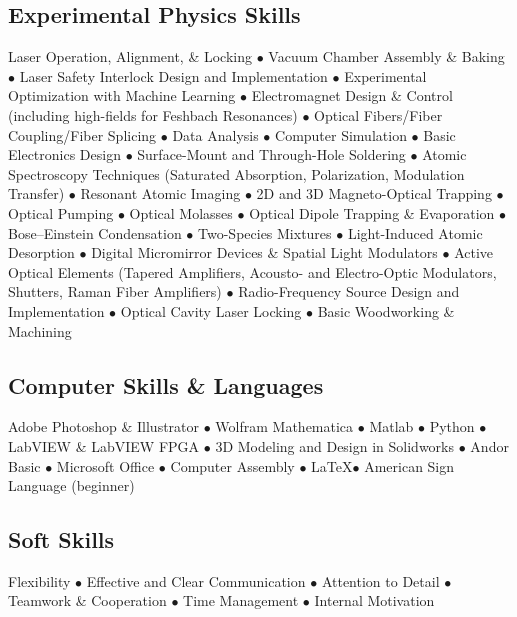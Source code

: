 \documentclass[12pt,letterpaper,sans]{moderncv}
\begin{document}
\subsection{Experimental Physics Skills}
Laser Operation, Alignment, \& Locking $\bullet$ Vacuum Chamber Assembly \& Baking $\bullet$ Laser Safety Interlock Design and Implementation $\bullet$ Experimental Optimization with Machine Learning $\bullet$ Electromagnet Design \& Control (including high-fields for Feshbach Resonances) $\bullet$ Optical Fibers/Fiber Coupling/Fiber Splicing $\bullet$ Data Analysis $\bullet$ Computer Simulation $\bullet$ Basic Electronics Design $\bullet$ Surface-Mount and Through-Hole Soldering $\bullet$ Atomic Spectroscopy Techniques (Saturated Absorption, Polarization, Modulation Transfer) $\bullet$ Resonant Atomic Imaging $\bullet$ 2D and 3D Magneto-Optical Trapping $\bullet$ Optical Pumping $\bullet$ Optical Molasses $\bullet$ Optical Dipole Trapping \& Evaporation $\bullet$ Bose--Einstein Condensation $\bullet$ Two-Species Mixtures $\bullet$ Light-Induced Atomic Desorption $\bullet$ Digital Micromirror Devices \& Spatial Light Modulators $\bullet$ Active Optical Elements (Tapered Amplifiers, Acousto- and Electro-Optic Modulators, Shutters, Raman Fiber Amplifiers) $\bullet$ Radio-Frequency Source Design and Implementation $\bullet$ Optical Cavity Laser Locking $\bullet$ Basic Woodworking \& Machining

\subsection{Computer Skills \& Languages}
Adobe Photoshop \& Illustrator $\bullet$ Wolfram Mathematica $\bullet$ Matlab $\bullet$ Python $\bullet$ LabVIEW \& LabVIEW FPGA $\bullet$ 3D Modeling and Design in Solidworks $\bullet$ Andor Basic $\bullet$ Microsoft Office $\bullet$ Computer Assembly $\bullet$ \LaTeX $\bullet$ American Sign Language (beginner)

\subsection{Soft Skills}
Flexibility $\bullet$ Effective and Clear Communication $\bullet$ Attention to Detail $\bullet$ Teamwork \& Cooperation $\bullet$ Time Management $\bullet$ Internal Motivation




\end{document}
